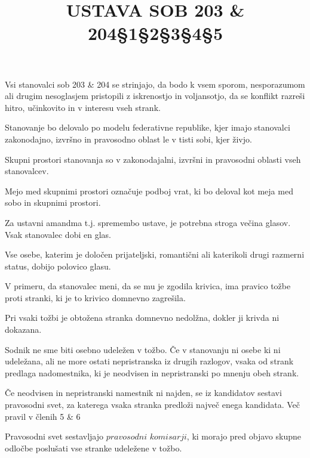 \documentclass[a4paper]{article}
\title{USTAVA SOB 203 \& 204}
\author{}
\begin{document}



\maketitle

\begin{center}
\Large\title{§1}

\large Vsi stanovalci sob 203 \& 204 se strinjajo, da bodo k vsem sporom, nesporazumom ali drugim nesoglasjem pristopili z iskrenostjo in voljansotjo, da se konflikt razreši hitro, učinkovito in v interesu vseh strank.

\Large\title{§2}

\large Stanovanje bo delovalo po modelu federativne republike, kjer imajo stanovalci zakonodajno, izvršno in pravosodno oblast le v tisti sobi, kjer živjo.

\large Skupni prostori stanovanja so v zakonodajalni, izvršni in pravosodni oblasti vseh stanovalcev.

\large Mejo med skupnimi prostori označuje podboj vrat, ki bo deloval kot meja med sobo in skupnimi prostori.


\Large\title{§3}

\large Za ustavni amandma t.j. spremembo ustave, je potrebna stroga večina glasov. Vsak stanovalec dobi en glas.

\large Vse osebe, katerim je določen prijateljski, romantični ali katerikoli drugi razmerni status, dobijo polovico glasu.

\Large\title{§4}

\large V primeru, da stanovalec meni, da se mu je zgodila krivica, ima pravico tožbe proti stranki, ki je to krivico domnevno zagrešila.

\large Pri vsaki tožbi je obtožena stranka domnevno nedolžna, dokler ji krivda ni dokazana.

\large Sodnik ne sme biti osebno udeležen v tožbo. Če v stanovanju ni osebe ki ni udeležana, ali ne more ostati nepristranska iz drugih razlogov, vsaka od strank predlaga nadomestnika, ki je neodvisen in nepristranski po mnenju obeh strank.

\large Če neodvisen in nepristranski namestnik ni najden, se iz kandidatov sestavi pravosodni svet, za katerega vsaka stranka predloži največ enega kandidata. Več pravil v členih 5 \& 6

\Large\title{§5}

\large Pravosodni svet sestavljajo $pravosodni$ $komisarji$, ki morajo pred objavo skupne odločbe poslušati vse stranke udeležene v tožbo.


\end{center}
\end{document}

